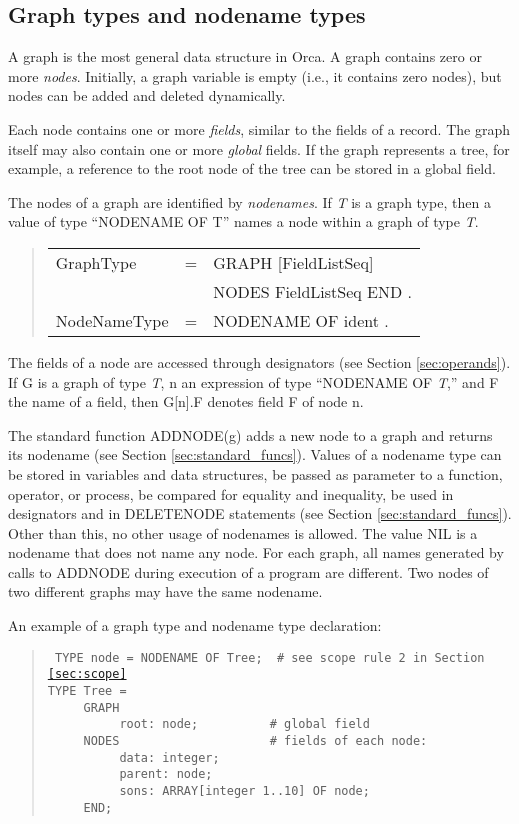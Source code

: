 \documentclass[10pt]{article}
\newenvironment{grammar}
{\begin{quote} \begin{tabular}{p{3.8cm} l l}}
{\end{tabular}\end{quote}}
\begin{document}
\subsection{Graph types and nodename types}\label{sec:graph_types}

A graph is the most general data structure in Orca.
A graph contains zero or more {\em nodes}.
Initially, a graph variable is empty (i.e., it contains zero nodes),
but nodes can be added and deleted dynamically.

Each node contains one or more {\em fields}, similar to the fields of
a record.
The graph itself may also contain one or more {\em global} fields.
If the graph represents a tree, for example, a reference to the root
node of the tree can be stored in a global field.

The nodes of a graph are identified by {\em nodenames}.
If {\em T} is a graph type,
then a value of type ``NODENAME OF T'' names a node within a graph
of type {\em T}.
\begin{grammar}
GraphType & = & GRAPH  [FieldListSeq] \\
& & NODES  FieldListSeq END . \\
NodeNameType & = & NODENAME OF ident .
\end{grammar}

The fields of a node are accessed through designators (see Section \ref{sec:operands}).
If G is a graph of type {\em T}, n an expression of type ``NODENAME OF {\em T},''
and F the name of a field, then G[n].F denotes field F of node n.

The standard function ADDNODE(g) adds a new node to a graph and returns
its nodename (see Section \ref{sec:standard_funcs}).
Values of a nodename type can be stored in variables and data structures,
be passed as parameter to a function, operator, or process,
be compared for equality and inequality,
be used in designators and in DELETENODE statements (see Section \ref{sec:standard_funcs}).
Other than this, no other usage of nodenames is allowed.
The value NIL is a nodename that does not name any node.
For each graph, all names generated by calls to ADDNODE during
execution of a program are different.
Two nodes of two different graphs may have the same nodename.

An example of a graph type and nodename type declaration:
\begin{quote}\tt
TYPE node = NODENAME OF Tree;~~\# see scope rule 2 in Section \ref{sec:scope} \\
TYPE Tree = \\
\mbox{~~~~~}GRAPH \\
\mbox{~~~~~~~~~~}root:~node;~~~~~~~~~~\# global field \\
\mbox{~~~~~}NODES~~~~~~~~~~~~~~~~~~~~~\# fields of each node: \\
\mbox{~~~~~~~~~~}data:~integer; \\
\mbox{~~~~~~~~~~}parent:~node; \\
\mbox{~~~~~~~~~~}sons:~ARRAY[integer 1..10] OF node; \\
\mbox{~~~~~}END;
\end{quote}
\end{document}

